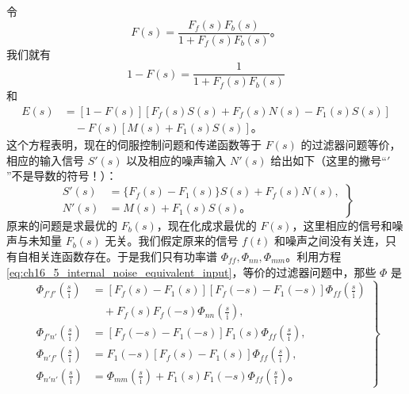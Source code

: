 令
\begin{equation}
F(s) = \frac{F_f(s)F_b(s)}{1+F_f(s)F_b(s)}。
\label{eq:ch16_5_internal_noise_feedback_eq}
\end{equation}
我们就有
\begin{equation*}
1-F(s) = \frac{1}{1+F_f(s)F_b(s)}
\end{equation*}
和
\begin{equation*}
\begin{aligned}
E(s) &= [1-F(s)][F_f(s)S(s)+F_f(s)N(s)-F_1(s)S(s)] \\
&\quad - F(s)[M(s)+F_1(s)S(s)]。
\end{aligned}
\end{equation*}
这个方程表明，现在的伺服控制问题和传递函数等于 $F(s)$ 的过滤器问题等价，相应的输入信号 $S'(s)$ 以及相应的噪声输入 $N'(s)$ 给出如下（这里的撇号“$'$”不是导数的符号！）：
\begin{equation}
\left.
\begin{aligned}
S'(s) &= \{F_f(s)-F_1(s)\}S(s)+F_f(s)N(s), \\
N'(s) &= M(s)+F_1(s)S(s)。
\end{aligned}
\right\}
\label{eq:ch16_5_internal_noise_equivalent_input}
\end{equation}
原来的问题是求最优的 $F_b(s)$，现在化成求最优的 $F(s)$，这里相应的信号和噪声与未知量 $F_b(s)$ 无关。我们假定原来的信号 $f(t)$ 和噪声之间没有关连，只有自相关连函数存在。于是我们只有功率谱 $\Phi_{ff},\Phi_{nn},\Phi_{mm}$。利用方程\eqref{eq:ch16_5_internal_noise_equivalent_input}，等价的过滤器问题中，那些 $\Phi$ 是
\begin{equation}
\left.
\begin{aligned}
\Phi_{f'f'}\left(\frac{s}{\mathrm{i}}\right) &= [F_f(s)-F_1(s)][F_f(-s)-F_1(-s)]\Phi_{ff}\left(\frac{s}{\mathrm{i}}\right) \\
&\quad + F_f(s)F_f(-s)\Phi_{nn}\left(\frac{s}{\mathrm{i}}\right), \\
\Phi_{f'n'}\left(\frac{s}{\mathrm{i}}\right) &= [F_f(-s)-F_1(-s)]F_1(s)\Phi_{ff}\left(\frac{s}{\mathrm{i}}\right), \\
\Phi_{n'f'}\left(\frac{s}{\mathrm{i}}\right) &= F_1(-s)[F_f(s)-F_1(s)]\Phi_{ff}\left(\frac{s}{\mathrm{i}}\right), \\
\Phi_{n'n'}\left(\frac{s}{\mathrm{i}}\right) &= \Phi_{mm}\left(\frac{s}{\mathrm{i}}\right)+F_1(s)F_1(-s)\Phi_{ff}\left(\frac{s}{\mathrm{i}}\right)。
\end{aligned}
\right\}
\label{eq:ch16_5_internal_noise_psd_relations}
\end{equation}
